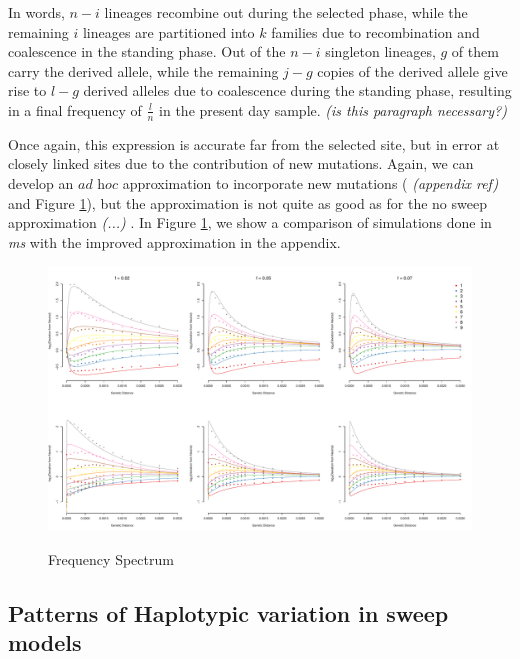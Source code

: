 \documentclass[a4paper,10pt]{article}
\newcommand{\jb}[1]{{\it\color{blue} (#1)} }
\begin{document}
In words, $n-i$ lineages recombine out during the selected phase, while the remaining $i$ lineages are partitioned into $k$ families due to recombination and coalescence in the standing phase. Out of the $n-i$ singleton lineages, $g$ of them carry the derived allele, while the remaining $j-g$ copies of the derived allele give rise to $l-g$ derived alleles due to coalescence during the standing phase, resulting in a final frequency of  $\frac{l}{n}$ in the present day sample. \jb{is this paragraph necessary?}


Once again, this expression is accurate far from the selected site, but in error at closely linked sites due to the contribution of new mutations. Again, we can develop an $\textit{ad hoc}$ approximation to incorporate new mutations (\jb{appendix ref} and Figure \ref{freq_spec}), but the approximation is not quite as good as for the no sweep approximation\jb{...}. In Figure \ref{freq_spec}, we show a comparison of simulations done in \textit{ms} with the improved approximation in the appendix.

\begin{figure}
	\includegraphics[width = \textwidth]{../Paper_Figures/freq_spec_nosweep_logfold_sixpanel_020507.pdf} \label{freq_spec}
	\caption{Frequency Spectrum}
\end{figure}

\subsection{Patterns of Haplotypic variation in sweep models}

%
\end{document}
